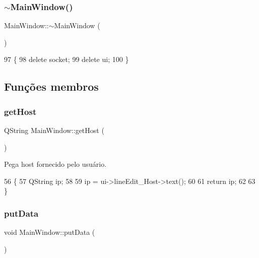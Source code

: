 \subsubsection{\texorpdfstring{$\sim$\+Main\+Window()}{~MainWindow()}}
{\footnotesize\ttfamily Main\+Window\+::$\sim$\+Main\+Window (\begin{DoxyParamCaption}{ }\end{DoxyParamCaption})}


\begin{DoxyCode}
97                        \{
98     \textcolor{keyword}{delete} socket;
99     \textcolor{keyword}{delete} ui;
100 \}
\end{DoxyCode}


\subsection{Funções membros}
\mbox{\label{class_main_window_a57a1f8959ed5f0eee73281829b2331fa}} 
\subsubsection{\texorpdfstring{get\+Host}{getHost}}
{\footnotesize\ttfamily Q\+String Main\+Window\+::get\+Host (\begin{DoxyParamCaption}{ }\end{DoxyParamCaption})\hspace{0.3cm}{\ttfamily [slot]}}



Pega host fornecido pelo usuário. 


\begin{DoxyCode}
56                            \{
57     QString ip;
58  
59     ip = ui->lineEdit\_Host->text();
60  
61     \textcolor{keywordflow}{return} ip;
62  
63 \}
\end{DoxyCode}
\mbox{\label{class_main_window_afdfeb13ec363b0eb8ecacaf0aa13b605}} 
\subsubsection{\texorpdfstring{put\+Data}{putData}}
{\footnotesize\ttfamily void Main\+Window\+::put\+Data (\begin{DoxyParamCaption}{ }\end{DoxyParamCaption})\hspace{0.3cm}{\ttfamily [slot]}}



